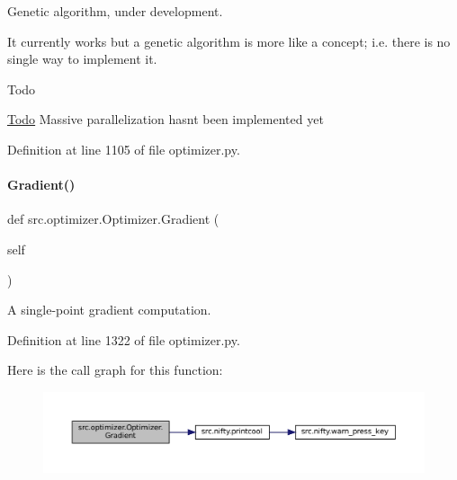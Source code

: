 Genetic algorithm, under development. 

It currently works but a genetic algorithm is more like a concept; i.\+e. there is no single way to implement it.

\begin{DoxyRefDesc}{Todo}
\item[\hyperlink{todo__todo000012}{Todo}]Massive parallelization hasn\textquotesingle{}t been implemented yet\end{DoxyRefDesc}


Definition at line 1105 of file optimizer.\+py.

\mbox{\label{classsrc_1_1optimizer_1_1Optimizer_af36709d05d137d77d4b8e0957b3c807e}} 
\paragraph{\texorpdfstring{Gradient()}{Gradient()}}
{\footnotesize\ttfamily def src.\+optimizer.\+Optimizer.\+Gradient (\begin{DoxyParamCaption}\item[{}]{self }\end{DoxyParamCaption})}



A single-\/point gradient computation. 



Definition at line 1322 of file optimizer.\+py.

Here is the call graph for this function\+:
\nopagebreak
\begin{figure}[H]
\begin{center}
\leavevmode
\includegraphics[width=350pt]{classsrc_1_1optimizer_1_1Optimizer_af36709d05d137d77d4b8e0957b3c807e_cgraph}
\end{center}
\end{figure}
\mbox{\label{classsrc_1_1optimizer_1_1Optimizer_ac844fd676b7e9d08c0c9bca811838c3a}} 
